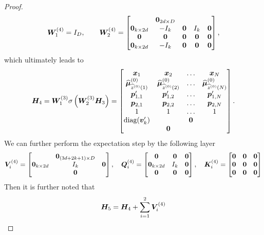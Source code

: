 \begin{proof}
\begin{align*}
    \boldsymbol{W}_1^{(4)}=I_D,\qquad\boldsymbol{W}_2^{(4)} = \begin{bmatrix}
        &\boldsymbol{0}_{2d\times D}&&\\
        \boldsymbol{0}_{k\times 2d}&-I_k&\boldsymbol{0}&I_k&\boldsymbol{0}\\
        \boldsymbol{0}&\boldsymbol{0}&\boldsymbol{0}&\boldsymbol{0}&\boldsymbol{0}\\
        \boldsymbol{0}_{k\times 2d}&-I_k&\boldsymbol{0}&\boldsymbol{0} &\boldsymbol{0}\\
    \end{bmatrix},
\end{align*}
which ultimately leads to 
\begin{align*}
    \boldsymbol{H}_4 = \boldsymbol{W}_1^{(3)}\sigma\left(\boldsymbol{W}_2^{(3)}\boldsymbol{H}_3\right) = \begin{bmatrix}
        \boldsymbol{x}_1&\boldsymbol{x}_2&\ldots&\boldsymbol{x}_N\\
        \widehat{\boldsymbol{\mu}}_{\widehat{z}^{(0)}(1)}^{(0)}&\widehat{\boldsymbol{\mu}}_{\widehat{z}^{(0)}(2)}^{(0)}&\ldots&\widehat{\boldsymbol{\mu}}_{\widehat{z}^{(0)}(N)}^{(0)}\\
        \boldsymbol{p}^\prime_{1,1}&\boldsymbol{p}^\prime_{1,2}&\ldots&\boldsymbol{p}^\prime_{1,N}\\
        \boldsymbol{p}_{2,1}&\boldsymbol{p}_{2,2}&\ldots&\boldsymbol{p}_{2,N}\\
        1&1&\ldots&1\\
        \text{diag}(\boldsymbol{v}_k^\prime)&&\boldsymbol{0}&\\
        &\boldsymbol{0}&&
    \end{bmatrix}.
\end{align*}
We can further perform the expectation step by the following layer
\begin{align*}
    \boldsymbol{V}_i^{(4)}=\begin{bmatrix}
        &\boldsymbol{0}_{(3d+2k+1)\times D}&\\
        \boldsymbol{0}_{k\times2d}& I_k&\boldsymbol{0}\\
        &\boldsymbol{0}&
    \end{bmatrix},\quad\boldsymbol{Q}_i^{(4)}=\begin{bmatrix}
        \boldsymbol{0}&\boldsymbol{0}&\boldsymbol{0}\\
        \boldsymbol{0}_{k\times2d}& I_k&\boldsymbol{0}\\
        \boldsymbol{0}&\boldsymbol{0}&\boldsymbol{0}
    \end{bmatrix},\quad\boldsymbol{K}_i^{(4)}=\begin{bmatrix}
        \boldsymbol{0}&\boldsymbol{0}&\boldsymbol{0}\\
        \boldsymbol{0}&\boldsymbol{0}&\boldsymbol{0}\\
        \boldsymbol{0}&\boldsymbol{0}&\boldsymbol{0}
    \end{bmatrix}
\end{align*}
Then it is further noted that
\begin{align*}
    \boldsymbol{H}_5 =\boldsymbol{H}_4+\sum_{i=1}^2\boldsymbol{V}_i^{(4)}
\end{align*}
\end{proof}




